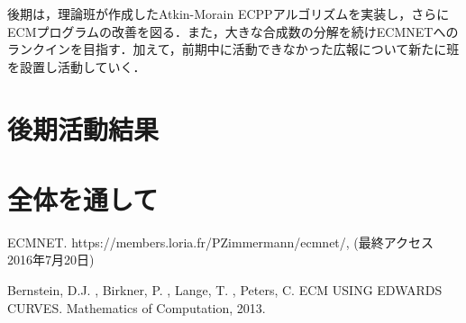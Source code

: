 \documentclass[openany,11pt,papersize]{jsbook}
\begin{document}
{後期は，理論班が作成したAtkin-Morain ECPPアルゴリズムを実装し，さらにECMプログラムの改善を図る．また，大きな合成数の分解を続けECMNETへのランクインを目指す．加えて，前期中に活動できなかった広報について新たに班を設置し活動していく．


\section{後期活動結果}


\section{全体を通して}





\begin{appendix}
\end{appendix}



\begin{thebibliography}{9}

\newblock ECMNET.
\newblock https://members.loria.fr/PZimmermann/ecmnet/, (最終アクセス 2016年7月20日)

\newblock Bernstein, D.J. , Birkner, P. , Lange, T. , Peters, C.
\newblock ECM USING EDWARDS CURVES.
\newblock Mathematics of Computation, 2013.


\end{thebibliography}}
\end{document}
